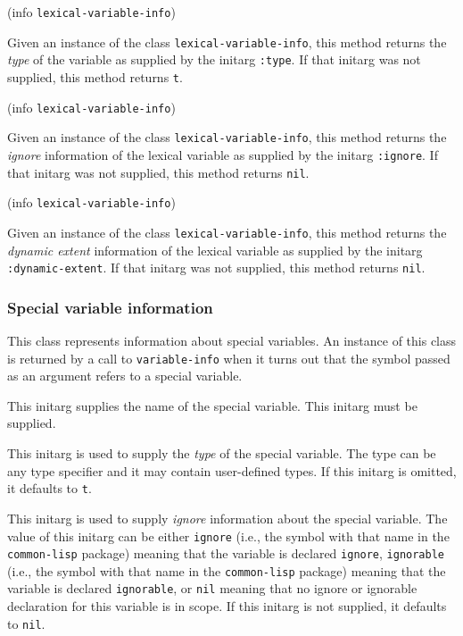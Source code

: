  {(info {\tt lexical-variable-info})}

Given an instance of the class \texttt{lexical-variable-info}, this
method returns the \emph{type} of the variable as supplied by the
initarg \texttt{:type}.  If that initarg was not supplied, this method
returns \texttt{t}.

 {(info {\tt lexical-variable-info})}

Given an instance of the class \texttt{lexical-variable-info}, this
method returns the \emph{ignore} information of the lexical variable as
supplied by the initarg \texttt{:ignore}.  If that initarg was not
supplied, this method returns \texttt{nil}.

 {(info {\tt lexical-variable-info})}

Given an instance of the class \texttt{lexical-variable-info}, this
method returns the \emph{dynamic extent} information of the lexical
variable as supplied by the initarg \texttt{:dynamic-extent}.  If that
initarg was not supplied, this method returns \texttt{nil}.

\subsubsection{Special variable information}


This class represents information about special variables.   An
instance of this class is returned by a call to \texttt{variable-info}
when it turns out that the symbol passed as an argument refers to a
special variable.



This initarg supplies the name of the special variable.  This initarg
must be supplied. 


This initarg is used to supply the \emph{type} of the special
variable.  The type can be any type specifier and it may contain
user-defined types.  If this initarg is omitted, it defaults to
\texttt{t}. 


This initarg is used to supply \emph{ignore} information about the
special variable.  The value of this initarg can be either
\texttt{ignore} (i.e., the symbol with that name in the
\texttt{common-lisp} package) meaning that the variable is declared
\texttt{ignore}, \texttt{ignorable} (i.e., the symbol with that name
in the \texttt{common-lisp} package) meaning that the variable is
declared \texttt{ignorable}, or \texttt{nil} meaning that no ignore or
ignorable declaration for this variable is in scope.  If this initarg
is not supplied, it defaults to \texttt{nil}.

